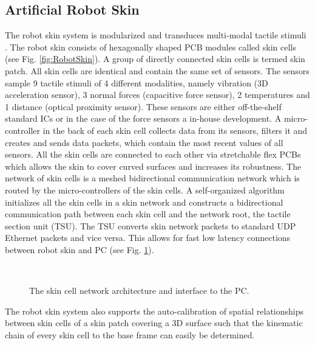\subsection{Artificial Robot Skin}
The robot skin system is modularized and transduces multi-modal tactile stimuli \cite{MittendorferYC15}. The robot skin consists of hexagonally shaped PCB modules called skin cells (see Fig. \ref{fig:RobotSkin}). A group of directly connected skin cells is termed skin patch. All skin cells are identical and contain the same set of sensors. The sensors sample 9 tactile stimuli of 4 different modalities, namely vibration (3D acceleration sensor), 3 normal forces (capacitive force sensor), 2 temperatures and 1 distance (optical proximity sensor). These sensors are either off-the-shelf standard ICs or in the case of the force sensors a in-house development. A micro-controller in the back of each skin cell collects data from its sensors, filters it and creates and sends data packets, which contain the most recent values of all sensors. All the skin cells are connected to each other via stretchable flex PCBs which allows the skin to cover curved surfaces and increases its robustness. The network of skin cells is a meshed bidirectional communication network which is routed by the micro-controllers of the skin cells. A self-organized algorithm initializes all the skin cells in a skin network and constructs a bidirectional communication path between each skin cell and the network root, the tactile section unit (TSU). The TSU converts skin network packets to standard UDP Ethernet packets and vice versa. This allows for fast low latency connections between robot skin and PC (see Fig. \ref{fig:SkinCellNetworkArchitecture}).
\begin{figure}[t]
\centering
{}\\[-15pt]
\caption[]{The skin cell network architecture and interface to the PC.}
\label{fig:SkinCellNetworkArchitecture}
\vspace{-10pt}
\end{figure}
The robot skin system also supports the auto-calibration of spatial relationships between skin cells of a skin patch covering a 3D 
surface \cite{Mittendorfer-IROS12tendorfer} such that the kinematic chain of every skin cell to the base frame can easily be determined.  

